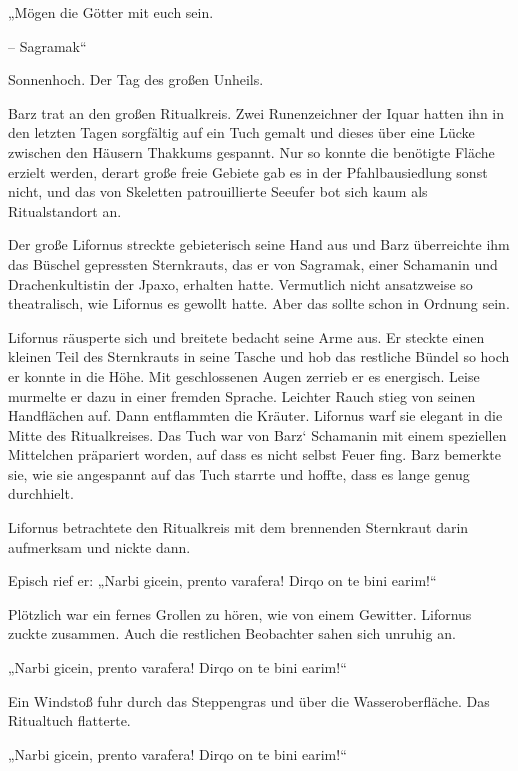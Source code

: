 „Mögen die Götter mit euch sein.

– Sagramak“



\trennzeichen



Sonnenhoch. Der Tag des großen Unheils.\bigskip



Barz trat an den großen Ritualkreis. Zwei Runenzeichner der Iquar hatten ihn in den letzten Tagen sorgfältig auf ein Tuch gemalt und dieses über eine Lücke zwischen den Häusern Thakkums gespannt. Nur so konnte die benötigte Fläche erzielt werden, derart große freie Gebiete gab es in der Pfahlbausiedlung sonst nicht, und das von Skeletten patrouillierte Seeufer bot sich kaum als Ritualstandort an.

Der große Lifornus streckte gebieterisch seine Hand aus und Barz überreichte ihm das Büschel gepressten Sternkrauts, das er von Sagramak, einer Schamanin und Drachenkultistin der Jpaxo, erhalten hatte. Vermutlich nicht ansatzweise so theatralisch, wie Lifornus es gewollt hatte. Aber das sollte schon in Ordnung sein.

Lifornus räusperte sich und breitete bedacht seine Arme aus. Er steckte einen kleinen Teil des Sternkrauts in seine Tasche und hob das restliche Bündel so hoch er konnte in die Höhe. Mit geschlossenen Augen zerrieb er es energisch. Leise murmelte er dazu in einer fremden Sprache. Leichter Rauch stieg von seinen Handflächen auf. Dann entflammten die Kräuter. Lifornus warf sie elegant in die Mitte des Ritualkreises. Das Tuch war von Barz‘ Schamanin mit einem speziellen Mittelchen präpariert worden, auf dass es nicht selbst Feuer fing. Barz bemerkte sie, wie sie angespannt auf das Tuch starrte und hoffte, dass es lange genug durchhielt.

Lifornus betrachtete den Ritualkreis mit dem brennenden Sternkraut darin aufmerksam und nickte dann.

Episch rief er: „Narbi gicein, prento varafera! Dirqo on te bini earim!“

Plötzlich war ein fernes Grollen zu hören, wie von einem Gewitter. Lifornus zuckte zusammen. Auch die restlichen Beobachter sahen sich unruhig an.

„Narbi gicein, prento varafera! Dirqo on te bini earim!“

Ein Windstoß fuhr durch das Steppengras und über die Wasseroberfläche. Das Ritualtuch flatterte.

„Narbi gicein, prento varafera! Dirqo on te bini earim!“

